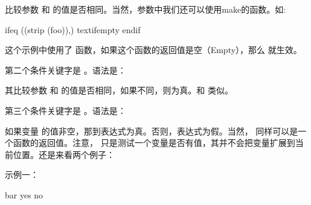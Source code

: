 \documentclass[a4paper,10pt]{sphinxmanual}
\begin{document}
比较参数  和  的值是否相同。当然，参数中我们还可以使用make的函数。如:

\begin{sphinxVerbatim}[commandchars=\\\{\}]
ifeq (\PYGZdl{}(strip \PYGZdl{}(foo)),)
\PYGZlt{}text\PYGZhy{}if\PYGZhy{}empty\PYGZgt{}
endif
\end{sphinxVerbatim}

这个示例中使用了  函数，如果这个函数的返回值是空（Empty），那么
 就生效。

第二个条件关键字是  。语法是：

\begin{sphinxVerbatim}[commandchars=\\\{\}]
\end{sphinxVerbatim}

其比较参数  和  的值是否相同，如果不同，则为真。和  类似。

第三个条件关键字是  。语法是：

\begin{sphinxVerbatim}[commandchars=\\\{\}]
\end{sphinxVerbatim}

如果变量  的值非空，那到表达式为真。否则，表达式为假。当然，
 同样可以是一个函数的返回值。注意，  只是测试一个变量是否有值，其并不会把变量扩展到当前位置。还是来看两个例子：

示例一：

\begin{sphinxVerbatim}[commandchars=\\\{\}]
 
  bar
      yes
      no
\end{sphinxVerbatim}
\end{document}
